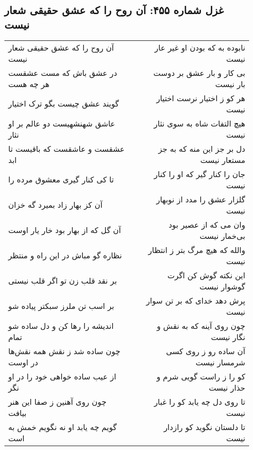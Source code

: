 \begin{center}
\section*{غزل شماره ۴۵۵: آن روح را که عشق حقیقی شعار نیست}
\label{sec:0455}
\begin{longtable}{l p{0.5cm} r}
آن روح را که عشق حقیقی شعار نیست
&&
نابوده به که بودن او غیر عار نیست
\\
در عشق باش که مست عشقست هر چه هست
&&
بی کار و بار عشق بر دوست بار نیست
\\
گویند عشق چیست بگو ترک اختیار
&&
هر کو ز اختیار نرست اختیار نیست
\\
عاشق شهنشهیست دو عالم بر او نثار
&&
هیچ التفات شاه به سوی نثار نیست
\\
عشقست و عاشقست که باقیست تا ابد
&&
دل بر جز این منه که به جز مستعار نیست
\\
تا کی کنار گیری معشوق مرده را
&&
جان را کنار گیر که او را کنار نیست
\\
آن کز بهار زاد بمیرد گه خزان
&&
گلزار عشق را مدد از نوبهار نیست
\\
آن گل که از بهار بود خار یار اوست
&&
وان می که از عصیر بود بی‌خمار نیست
\\
نظاره گو مباش در این راه و منتظر
&&
والله که هیچ مرگ بتر ز انتظار نیست
\\
بر نقد قلب زن تو اگر قلب نیستی
&&
این نکته گوش کن اگرت گوشوار نیست
\\
بر اسب تن ملرز سبکتر پیاده شو
&&
پرش دهد خدای که بر تن سوار نیست
\\
اندیشه را رها کن و دل ساده شو تمام
&&
چون روی آینه که به نقش و نگار نیست
\\
چون ساده شد ز نقش همه نقش‌ها در اوست
&&
آن ساده رو ز روی کسی شرمسار نیست
\\
از عیب ساده خواهی خود را در او نگر
&&
کو را ز راست گویی شرم و حذار نیست
\\
چون روی آهنین ز صفا این هنر بیافت
&&
تا روی دل چه یابد کو را غبار نیست
\\
گویم چه یابد او نه نگویم خمش به است
&&
تا دلستان نگوید کو رازدار نیست
\\
\end{longtable}
\end{center}

